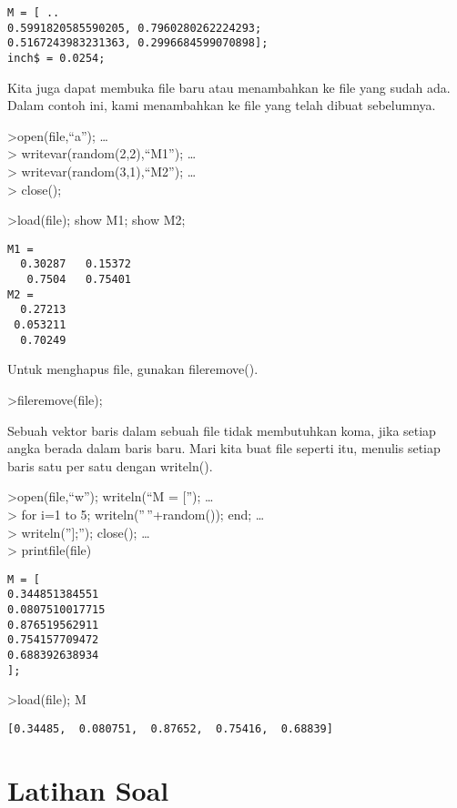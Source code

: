 \documentclass[
]{book}
\begin{document}
\begin{verbatim}
M = [ ..
0.5991820585590205, 0.7960280262224293;
0.5167243983231363, 0.2996684599070898];
inch$ = 0.0254;
\end{verbatim}

Kita juga dapat membuka file baru atau menambahkan ke file yang sudah ada. Dalam contoh ini, kami menambahkan ke file yang telah dibuat sebelumnya.

\textgreater open(file,``a''); \ldots{}\\
\textgreater{} writevar(random(2,2),``M1''); \ldots{}\\
\textgreater{} writevar(random(3,1),``M2''); \ldots{}\\
\textgreater{} close();

\textgreater load(file); show M1; show M2;

\begin{verbatim}
M1 = 
  0.30287   0.15372 
   0.7504   0.75401 
M2 = 
  0.27213 
 0.053211 
  0.70249 
\end{verbatim}

Untuk menghapus file, gunakan fileremove().

\textgreater fileremove(file);

Sebuah vektor baris dalam sebuah file tidak membutuhkan koma, jika setiap angka berada dalam baris baru. Mari kita buat file seperti itu, menulis setiap baris satu per satu dengan writeln().

\textgreater open(file,``w''); writeln(``M = {[}''); \ldots{}\\
\textgreater{} for i=1 to 5; writeln(''\,''+random()); end; \ldots{}\\
\textgreater{} writeln(''{]};''); close(); \ldots{}\\
\textgreater{} printfile(file)

\begin{verbatim}
M = [
0.344851384551
0.0807510017715
0.876519562911
0.754157709472
0.688392638934
];
\end{verbatim}

\textgreater load(file); M

\begin{verbatim}
[0.34485,  0.080751,  0.87652,  0.75416,  0.68839]
\end{verbatim}

\chapter{Latihan Soal}\label{latihan-soal}
\end{document}
